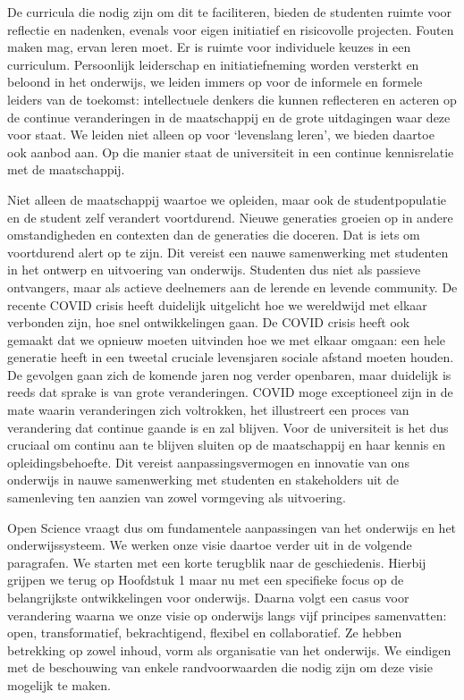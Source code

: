 \documentclass{jote-book}
\begin{document}
	De curricula die nodig zijn om dit te faciliteren, bieden de studenten ruimte voor reflectie en nadenken, evenals voor eigen initiatief en risicovolle projecten. Fouten maken mag, ervan leren moet. Er is ruimte voor individuele keuzes in een curriculum. Persoonlijk leiderschap en initiatiefneming worden versterkt en beloond in het onderwijs, we leiden immers op voor de informele en formele leiders van de toekomst: intellectuele denkers die kunnen reflecteren en acteren op de continue veranderingen in de maatschappij en de grote uitdagingen waar deze voor staat. We leiden niet alleen op voor ‘levenslang leren', we bieden daartoe ook aanbod aan. Op die manier staat de universiteit in een continue kennisrelatie met de maatschappij.



	Niet alleen de maatschappij waartoe we opleiden, maar ook de studentpopulatie en de student zelf verandert voortdurend. Nieuwe generaties groeien op in andere omstandigheden en contexten dan de generaties die doceren. Dat is iets om voortdurend alert op te zijn. Dit vereist een nauwe samenwerking met studenten in het ontwerp en uitvoering van onderwijs. Studenten dus niet als passieve ontvangers, maar als actieve deelnemers aan de lerende en levende community. De recente COVID crisis heeft duidelijk uitgelicht hoe we wereldwijd met elkaar verbonden zijn, hoe snel ontwikkelingen gaan. De COVID crisis heeft ook gemaakt dat we opnieuw moeten uitvinden hoe we met elkaar omgaan: een hele generatie heeft in een tweetal cruciale levensjaren sociale afstand moeten houden. De gevolgen gaan zich de komende jaren nog verder openbaren, maar duidelijk is reeds dat sprake is van grote veranderingen. COVID moge exceptioneel zijn in de mate waarin veranderingen zich voltrokken, het illustreert een proces van verandering dat continue gaande is en zal blijven. Voor de universiteit is het dus cruciaal om continu aan te blijven sluiten op de maatschappij en haar kennis en opleidingsbehoefte. Dit vereist aanpassingsvermogen en innovatie van ons onderwijs in nauwe samenwerking met studenten en stakeholders uit de samenleving ten aanzien van zowel vormgeving als uitvoering.



	Open Science vraagt dus om fundamentele aanpassingen van het onderwijs en het onderwijssysteem. We werken onze visie daartoe verder uit in de volgende paragrafen. We starten met een korte terugblik naar de geschiedenis. Hierbij grijpen we terug op Hoofdstuk 1 maar nu met een specifieke focus op de belangrijkste ontwikkelingen voor onderwijs. Daarna volgt een casus voor verandering waarna we onze visie op onderwijs langs vijf principes samenvatten: open, transformatief, bekrachtigend, flexibel en collaboratief. Ze hebben betrekking op zowel inhoud, vorm als organisatie van het onderwijs. We eindigen met de beschouwing van enkele randvoorwaarden die nodig zijn om deze visie mogelijk te maken.
\end{document}
